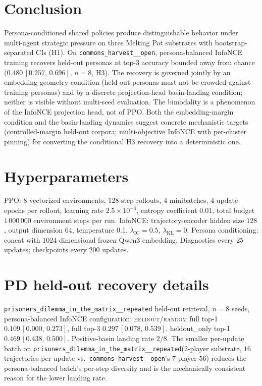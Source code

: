 \documentclass[11pt]{article}
\newcommand{\InfoNCE}{InfoNCE\xspace}
\newcommand{\cH}{\texttt{commons\_harvest\_\_open}\xspace}
\newcommand{\PD}{\texttt{prisoners\_dilemma\_in\_the\_matrix\_\_repeated}\xspace}
\begin{document}
\section{Conclusion}
\label{sec:conc}

Persona-conditioned shared policies produce distinguishable behavior under
multi-agent strategic pressure on three Melting Pot substrates with
bootstrap-separated CIs (H1). On \cH, persona-balanced \InfoNCE training
recovers held-out personas at top-3 accuracy bounded away from chance
($0.480\,[0.257,\,0.696]$, $n=8$, H3). The recovery is governed jointly by an
embedding-geometry condition (held-out personas must not be crowded against
training personas) and by a discrete projection-head basin-landing condition;
neither is visible without multi-seed evaluation. The bimodality is a
phenomenon of the \InfoNCE projection head, not of PPO. Both the
embedding-margin condition and the basin-landing dynamics suggest concrete
mechanistic targets (controlled-margin held-out corpora; multi-objective
\InfoNCE with per-cluster pinning) for converting the conditional H3
recovery into a deterministic one.




\appendix

\section{Hyperparameters}
\label{app:hparams}

PPO: $8$ vectorized environments, $128$-step rollouts, $4$ minibatches, $4$
update epochs per rollout, learning rate $2.5 \times 10^{-4}$, entropy
coefficient $0.01$, total budget $1\,000\,000$ environment steps per run.
\InfoNCE: trajectory-encoder hidden size $128$, output dimension $64$,
temperature $0.1$, $\lambda_{\text{IC}} = 0.5$, $\lambda_{\text{KL}} = 0$.
Persona conditioning: concat with $1024$-dimensional frozen Qwen3 embedding.
Diagnostics every $25$ updates; checkpoints every $200$ updates.

\section{PD held-out recovery details}
\label{app:pd}

\PD held-out retrieval, $n=8$ seeds, persona-balanced \InfoNCE
configuration: \textsc{heldout/random} full top-1 $0.109\,[0.000,\,0.273]$,
full top-3 $0.297\,[0.078,\,0.539]$, heldout\_only top-1
$0.469\,[0.438,\,0.500]$. Positive-basin landing rate $2/8$. The smaller
per-update batch on \PD ($2$-player substrate, $16$ trajectories per update
vs.\ \cH's $7$-player $56$) reduces the persona-balanced batch's per-step
diversity and is the mechanically consistent reason for the lower landing
rate.
\end{document}
